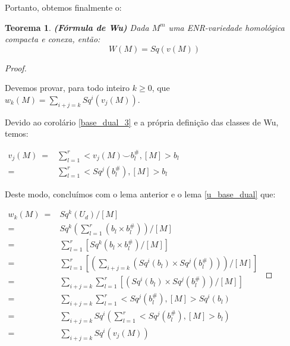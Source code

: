 \documentclass[12pt,oneside]{book} %
\newtheorem{teo}    {\hspace{0.5cm}Teorema}[chapter]
\newcommand{\ds}{\displaystyle}
\newcommand{\ccup}{\smile}
\begin{document}
\par Portanto, obtemos finalmente o:

\begin{teo}{\bf (Fórmula de Wu)}
Dada $M^{m}$ uma ENR-variedade homológica compacta e conexa, então:
	$$ W(M)=Sq(v(M)) $$
\end{teo}
\begin{proof}
	
	\
	
	\par Devemos provar, para todo inteiro $k\geq 0$, que $w_{k}(M)=\ds\sum_{i+j=k}Sq^{i}(v_{j}(M))$.
	
	\par Devido ao corolário \ref{base_dual_3} e a própria definição das classes de Wu, temos: \newline 
	
	$ \begin{array}{rl}
		v_{j}(M) \ = & \ds\sum_{l=1}^{r}<v_{j}(M)\ccup b_{l}^{\#},[M]>b_{l} \\
		= & \ds\sum_{l=1}^{r}<Sq^{j}(b_{l}^{\#}),[M]>b_{l}
	\end{array} $ \newline
	
	\par Deste modo, concluímos com o lema anterior e o lema \ref{u_base_dual} que: \newline
	
	$\begin{array}{rl}
		w_{k}(M) \ = & Sq^{k}(U_{d})/[M] \\
		= & Sq^{k}\left( \ds\sum_{l=1}^{r}(b_{l}\times b_{l}^{\#}) \right) / [M] \\
		= & \ds\sum_{l=1}^{r} \left[ Sq^{k}(b_{l}\times b_{l}^{\#}) / [M] \right] \\
		= & \ds\sum_{l=1}^{r} \left[ \left( \ds\sum_{i+j=k} \left( Sq^{i}(b_{l})\times Sq^{j}(b_{l}^{\#}) \right) \right) / [M] \right] \\
		= & \ds\sum_{i+j=k}\ds\sum_{l=1}^{r} \left[ \left( Sq^{i}(b_{l})\times Sq^{j}(b_{l}^{\#}) \right) /[M] \right] \\
		= & \ds\sum_{i+j=k}\ds\sum_{l=1}^{r}<Sq^{j}(b_{l}^{\#}),[M]>Sq^{i}(b_{l}) \\
		= & \ds\sum_{i+j=k}Sq^{i}\left( \ds\sum_{l=1}^{r}<Sq^{j}(b_{l}^{\#}),[M]>b_{l} \right) \\
		= & \ds\sum_{i+j=k}Sq^{i}(v_{j}(M))
	\end{array}$
	
\end{proof}
\end{document}
